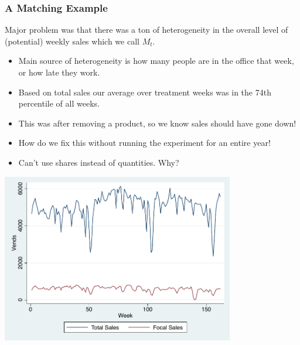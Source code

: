 \documentclass[xcolor=pdftex,dvipsnames,table,mathserif,aspectratio=169]{beamer}
\begin{document}
\begin{frame}
\frametitle{A Matching Example}
Major problem was that there was a ton of heterogeneity in the overall level of (potential) weekly sales which we call $M_t$.
\begin{itemize}
\item Main source of heterogeneity is how many people are in the office that week, or how late they work.
\item Based on total sales our average over treatment weeks was in the 74th percentile of all weeks.
\item This was after removing a product, so we know sales should have gone down!
\item How do we fix this without running the experiment for an entire year!
\item Can't use shares instead of quantities. Why?
\end{itemize}
\end{frame}

\begin{frame}
\begin{center}
\includegraphics[width=4in]{./resources/figure1.pdf}
\end{center}
\end{frame}
\end{document}
